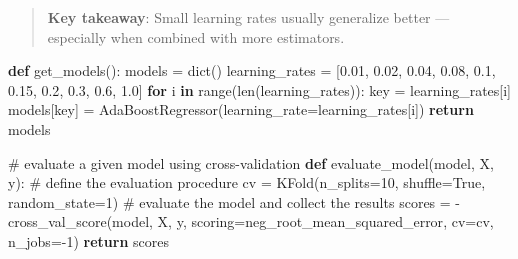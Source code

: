 \documentclass[
  letterpaper,
  DIV=11,
  numbers=noendperiod]{scrreprt}
\newenvironment{Shaded}{\begin{snugshade}}{\end{snugshade}}
\newcommand{\BuiltInTok}[1]{\textcolor[rgb]{0.00,0.23,0.31}{#1}}
\newcommand{\CommentTok}[1]{\textcolor[rgb]{0.37,0.37,0.37}{#1}}
\newcommand{\ControlFlowTok}[1]{\textcolor[rgb]{0.00,0.23,0.31}{\textbf{#1}}}
\newcommand{\DecValTok}[1]{\textcolor[rgb]{0.68,0.00,0.00}{#1}}
\newcommand{\FloatTok}[1]{\textcolor[rgb]{0.68,0.00,0.00}{#1}}
\newcommand{\KeywordTok}[1]{\textcolor[rgb]{0.00,0.23,0.31}{\textbf{#1}}}
\newcommand{\NormalTok}[1]{\textcolor[rgb]{0.00,0.23,0.31}{#1}}
\newcommand{\OperatorTok}[1]{\textcolor[rgb]{0.37,0.37,0.37}{#1}}
\newcommand{\StringTok}[1]{\textcolor[rgb]{0.13,0.47,0.30}{#1}}
\newcommand{\VariableTok}[1]{\textcolor[rgb]{0.07,0.07,0.07}{#1}}
\begin{document}
\begin{quote}
\textbf{Key takeaway}: Small learning rates usually generalize better
--- especially when combined with more estimators.
\end{quote}

\begin{Shaded}
\begin{Highlighting}[]
\KeywordTok{def}\NormalTok{ get\_models():}
\NormalTok{    models }\OperatorTok{=} \BuiltInTok{dict}\NormalTok{()}
\NormalTok{    learning\_rates }\OperatorTok{=}\NormalTok{ [}\FloatTok{0.01}\NormalTok{, }\FloatTok{0.02}\NormalTok{, }\FloatTok{0.04}\NormalTok{, }\FloatTok{0.08}\NormalTok{, }\FloatTok{0.1}\NormalTok{, }\FloatTok{0.15}\NormalTok{, }\FloatTok{0.2}\NormalTok{, }\FloatTok{0.3}\NormalTok{, }\FloatTok{0.6}\NormalTok{, }\FloatTok{1.0}\NormalTok{]}
    \ControlFlowTok{for}\NormalTok{ i }\KeywordTok{in} \BuiltInTok{range}\NormalTok{(}\BuiltInTok{len}\NormalTok{(learning\_rates)):}
\NormalTok{        key }\OperatorTok{=}\NormalTok{ learning\_rates[i]}
\NormalTok{        models[key] }\OperatorTok{=}\NormalTok{ AdaBoostRegressor(learning\_rate}\OperatorTok{=}\NormalTok{learning\_rates[i])}
    \ControlFlowTok{return}\NormalTok{ models}

\CommentTok{\# evaluate a given model using cross{-}validation}
\KeywordTok{def}\NormalTok{ evaluate\_model(model, X, y):}
    \CommentTok{\# define the evaluation procedure}
\NormalTok{    cv }\OperatorTok{=}\NormalTok{ KFold(n\_splits}\OperatorTok{=}\DecValTok{10}\NormalTok{, shuffle}\OperatorTok{=}\VariableTok{True}\NormalTok{, random\_state}\OperatorTok{=}\DecValTok{1}\NormalTok{)}
    \CommentTok{\# evaluate the model and collect the results}
\NormalTok{    scores }\OperatorTok{=} \OperatorTok{{-}}\NormalTok{cross\_val\_score(model, X, y, scoring}\OperatorTok{=}\StringTok{\textquotesingle{}neg\_root\_mean\_squared\_error\textquotesingle{}}\NormalTok{, cv}\OperatorTok{=}\NormalTok{cv, n\_jobs}\OperatorTok{={-}}\DecValTok{1}\NormalTok{)}
    \ControlFlowTok{return}\NormalTok{ scores}


\end{Highlighting}
\end{Shaded}
\end{document}
